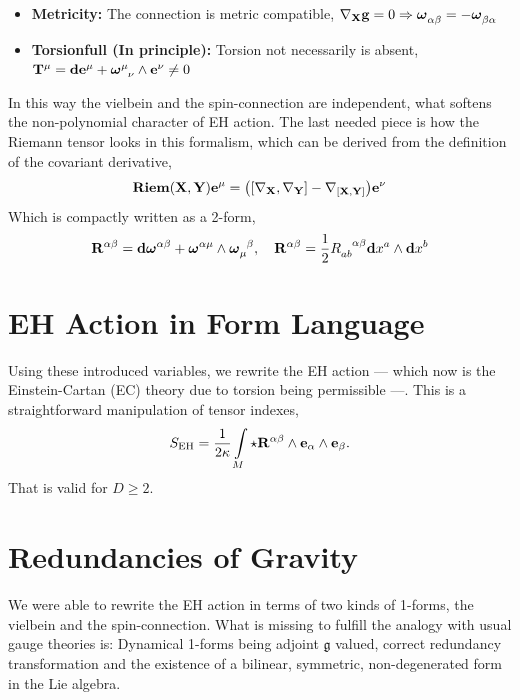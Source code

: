 \documentclass[a0,portrait]{a0poster}
\begin{document}
\begin{multicols}{2}
\begin{itemize}
    \item \textbf{Metricity:} The connection is metric compatible, $\nabla_{\vb X} \vb g =0\Rightarrow \tensor{{\boldsymbol\omega}}{_\alpha_\beta}=-\tensor{{\boldsymbol\omega}}{_\beta_\alpha}$
    \item \textbf{Torsionfull (In principle):} Torsion not necessarily is absent, $\vb T^\mu = \vb d \vb e^\mu+\tensor{{\boldsymbol\omega}}{^\mu_\nu}\wedge \vb e^\nu\neq0$
\end{itemize}
In this way the vielbein and the spin-connection are independent, what softens the non-polynomial character of EH action. 
The last needed piece is how the Riemann tensor looks in this formalism, which can be derived from the definition of the 
covariant derivative,
\[\vb {Riem}\qty(\vb X, \vb Y)\vb e^\mu=\qty(\comm{\nabla_{\vb X}}{\nabla_{\vb Y}}-\nabla_{\comm{\vb X}{\vb Y}})\vb e^\nu\]
Which is compactly written as a 2-form,
\[\vb R^{\alpha\beta} = \vb d\boldsymbol\omega^{\alpha\beta}+\boldsymbol\omega^{\alpha\mu}\wedge\tensor{{\boldsymbol\omega}}{_\mu^\beta},\ \ \ \vb R^{\alpha\beta} = \frac12 \tensor{R}{_a_b^\alpha^\beta}\vb dx^a\wedge\vb d x^b\]

\section*{EH Action in Form Language}

Using these introduced variables, we rewrite the EH action --- which now is the Einstein-Cartan (EC) theory due to torsion being permissible ---. 
This is a straightforward manipulation of tensor indexes,
\[S_{\textnormal{EH}}= \frac{1}{2\kappa}\int\limits_M\star\vb R^{\alpha\beta}\wedge \vb e_\alpha\wedge \vb e_\beta.\]
That is valid for $D\geq 2$.

\section*{Redundancies of Gravity}

We were able to rewrite the EH action in terms of two kinds of 1-forms, the vielbein and the spin-connection. What is missing 
to fulfill the analogy with usual gauge theories is: Dynamical 1-forms being adjoint $\mathfrak g$ valued, correct redundancy 
transformation and the existence of a bilinear, symmetric, non-degenerated form in the Lie algebra.


\end{multicols}
\end{document}
